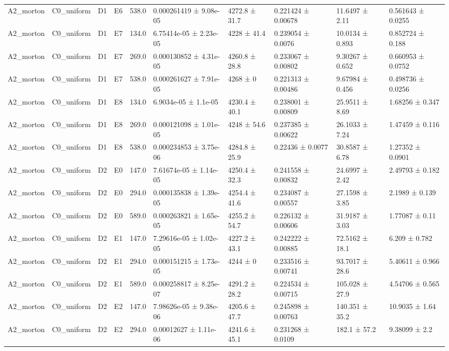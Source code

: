 \begin{table}
\begin{tabular}{llllllllll}
A2\_morton & C0\_uniform & D1 & E6 & 538.0 & 0.000261419 ± 9.08e-05 & 4272.8 ± 31.7 & 0.221424 ± 0.00678 & 11.6497 ± 2.11 & 0.561643 ± 0.0255 \\
A2\_morton & C0\_uniform & D1 & E7 & 134.0 & 6.75414e-05 ± 2.23e-05 & 4228 ± 41.4 & 0.239054 ± 0.0076 & 10.0134 ± 0.893 & 0.852724 ± 0.188 \\
A2\_morton & C0\_uniform & D1 & E7 & 269.0 & 0.000130852 ± 4.31e-05 & 4260.8 ± 28.8 & 0.233067 ± 0.00802 & 9.30267 ± 0.652 & 0.660953 ± 0.0752 \\
A2\_morton & C0\_uniform & D1 & E7 & 538.0 & 0.000261627 ± 7.91e-05 & 4268 ± 0 & 0.221313 ± 0.00486 & 9.67984 ± 0.456 & 0.498736 ± 0.0256 \\
A2\_morton & C0\_uniform & D1 & E8 & 134.0 & 6.9034e-05 ± 1.1e-05 & 4230.4 ± 40.1 & 0.238001 ± 0.00809 & 25.9511 ± 8.69 & 1.68256 ± 0.347 \\
A2\_morton & C0\_uniform & D1 & E8 & 269.0 & 0.000121098 ± 1.01e-05 & 4248 ± 54.6 & 0.237385 ± 0.00622 & 26.1033 ± 7.24 & 1.47459 ± 0.116 \\
A2\_morton & C0\_uniform & D1 & E8 & 538.0 & 0.000234853 ± 3.75e-06 & 4284.8 ± 25.9 & 0.22436 ± 0.0077 & 30.8587 ± 6.78 & 1.27352 ± 0.0901 \\
A2\_morton & C0\_uniform & D2 & E0 & 147.0 & 7.61674e-05 ± 1.14e-05 & 4250.4 ± 32.3 & 0.241558 ± 0.00832 & 24.6997 ± 2.42 & 2.49793 ± 0.182 \\
A2\_morton & C0\_uniform & D2 & E0 & 294.0 & 0.000135838 ± 1.39e-05 & 4254.4 ± 41.6 & 0.234087 ± 0.00557 & 27.1598 ± 3.85 & 2.1989 ± 0.139 \\
A2\_morton & C0\_uniform & D2 & E0 & 589.0 & 0.000263821 ± 1.65e-05 & 4255.2 ± 54.7 & 0.226132 ± 0.00606 & 31.9187 ± 3.03 & 1.77087 ± 0.11 \\
A2\_morton & C0\_uniform & D2 & E1 & 147.0 & 7.29616e-05 ± 1.02e-05 & 4227.2 ± 43.1 & 0.242222 ± 0.00885 & 72.5162 ± 18.1 & 6.209 ± 0.782 \\
A2\_morton & C0\_uniform & D2 & E1 & 294.0 & 0.000151215 ± 1.73e-05 & 4244 ± 0 & 0.233516 ± 0.00741 & 93.7017 ± 28.6 & 5.40611 ± 0.966 \\
A2\_morton & C0\_uniform & D2 & E1 & 589.0 & 0.000258817 ± 8.25e-07 & 4291.2 ± 28.2 & 0.224534 ± 0.00715 & 105.028 ± 27.9 & 4.54706 ± 0.565 \\
A2\_morton & C0\_uniform & D2 & E2 & 147.0 & 7.98626e-05 ± 9.38e-06 & 4205.6 ± 47.7 & 0.245898 ± 0.00763 & 140.351 ± 35.2 & 10.9035 ± 1.64 \\
A2\_morton & C0\_uniform & D2 & E2 & 294.0 & 0.00012627 ± 1.11e-06 & 4241.6 ± 45.1 & 0.231268 ± 0.0109 & 182.1 ± 57.2 & 9.38099 ± 2.2 \\

\end{tabular}
\end{table}
